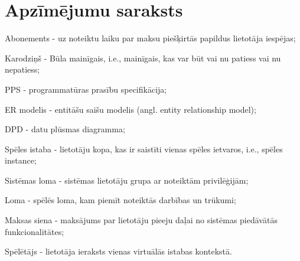 \section*{Apzīmējumu saraksts}

Abonements - uz noteiktu laiku par maksu piešķirtās papildus lietotāja iespējas;

Karodziņš  - Būla mainīgais, i.e., mainīgais, kas var būt vai nu patiess vai nu nepatiess;

PPS - programmatūras prasību specifikācija;

ER modelis - entitāšu saišu modelis (angl. entity relationship model);

DPD - datu plūsmas diagramma;

Spēles istaba - lietotāju kopa, kas ir saistīti vienas spēles ietvaros, i.e., spēles instance;

Sistēmas loma - sistēmas lietotāju grupa ar noteiktām privilēģijām;

Loma - spēlēs loma, kam piemīt noteiktās darbības un trūkumi;

Maksas siena - maksājums par lietotāju pieeju daļai no sistēmas piedāvātās funkcionalitātes;

Spēlētājs - lietotāja ieraksts vienas virtuālās istabas kontekstā.
